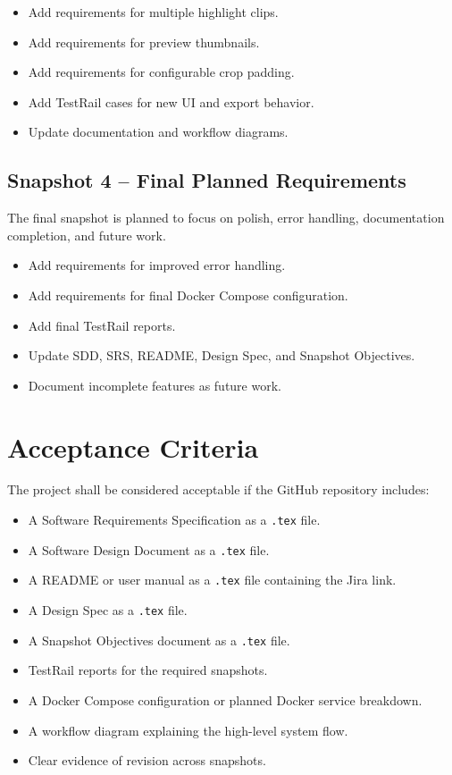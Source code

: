 \documentclass[12pt]{article}
\begin{document}
\begin{itemize}[noitemsep]
    \item Add requirements for multiple highlight clips.
    \item Add requirements for preview thumbnails.
    \item Add requirements for configurable crop padding.
    \item Add TestRail cases for new UI and export behavior.
    \item Update documentation and workflow diagrams.
\end{itemize}

\subsection{Snapshot 4 -- Final Planned Requirements}
The final snapshot is planned to focus on polish, error handling, documentation completion, and future work.

\begin{itemize}[noitemsep]
    \item Add requirements for improved error handling.
    \item Add requirements for final Docker Compose configuration.
    \item Add final TestRail reports.
    \item Update SDD, SRS, README, Design Spec, and Snapshot Objectives.
    \item Document incomplete features as future work.
\end{itemize}

\newpage

\section{Acceptance Criteria}

The project shall be considered acceptable if the GitHub repository includes:
\begin{itemize}[noitemsep]
    \item A Software Requirements Specification as a \texttt{.tex} file.
    \item A Software Design Document as a \texttt{.tex} file.
    \item A README or user manual as a \texttt{.tex} file containing the Jira link.
    \item A Design Spec as a \texttt{.tex} file.
    \item A Snapshot Objectives document as a \texttt{.tex} file.
    \item TestRail reports for the required snapshots.
    \item A Docker Compose configuration or planned Docker service breakdown.
    \item A workflow diagram explaining the high-level system flow.
    \item Clear evidence of revision across snapshots.
\end{itemize}
\end{document}
